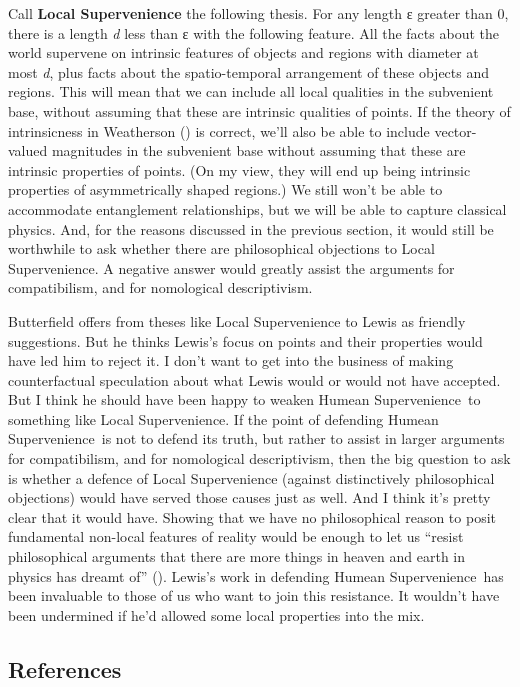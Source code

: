 \documentclass[
  10pt,
  letterpaper,
  DIV=11,
  numbers=noendperiod,
  twoside]{scrartcl}
\begin{document}
Call \textbf{Local Supervenience} the following thesis. For any length ε
greater than 0, there is a length \emph{d} less than ε with the
following feature. All the facts about the world supervene on intrinsic
features of objects and regions with diameter at most \emph{d}, plus
facts about the spatio-temporal arrangement of these objects and
regions. This will mean that we can include all local qualities in the
subvenient base, without assuming that these are intrinsic qualities of
points. If the theory of intrinsicness in Weatherson
() is correct, we'll also be
able to include vector-valued magnitudes in the subvenient base without
assuming that these are intrinsic properties of points. (On my view,
they will end up being intrinsic properties of asymmetrically shaped
regions.) We still won't be able to accommodate entanglement
relationships, but we will be able to capture classical physics. And,
for the reasons discussed in the previous section, it would still be
worthwhile to ask whether there are philosophical objections to Local
Supervenience. A negative answer would greatly assist the arguments for
compatibilism, and for nomological descriptivism.

Butterfield offers from theses like Local Supervenience to Lewis as
friendly suggestions. But he thinks Lewis's focus on points and their
properties would have led him to reject it. I don't want to get into the
business of making counterfactual speculation about what Lewis would or
would not have accepted. But I think he should have been happy to weaken
Humean Supervenience~to something like Local Supervenience. If the point
of defending Humean Supervenience~is not to defend its truth, but rather
to assist in larger arguments for compatibilism, and for nomological
descriptivism, then the big question to ask is whether a defence of
Local Supervenience (against distinctively philosophical objections)
would have served those causes just as well. And I think it's pretty
clear that it would have. Showing that we have no philosophical reason
to posit fundamental non-local features of reality would be enough to
let us ``resist philosophical arguments that there are more things in
heaven and earth in physics has dreamt of''
(). Lewis's work in defending
Humean Supervenience~has been invaluable to those of us who want to join
this resistance. It wouldn't have been undermined if he'd allowed some
local properties into the mix.

\subsection*{References}\label{references}
\end{document}
